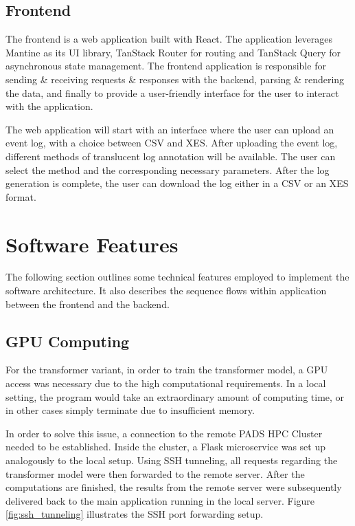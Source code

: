\subsection{Frontend}

The frontend is a web application built with React. The application leverages Mantine as its UI library, TanStack Router for routing and TanStack Query for asynchronous state management. The frontend application is responsible for sending \& receiving requests \& responses with the backend, parsing \& rendering the data, and finally to provide a user-friendly interface for the user to interact with the application.

The web application will start with an interface where the user can upload an event log, with a choice between CSV and XES. After uploading the event log, different methods of translucent log annotation will be available. The user can select the method and the corresponding necessary parameters. After the log generation is complete, the user can download the log either in a CSV or an XES format.

\section{Software Features}

The following section outlines some technical features employed to implement the software architecture. It also describes the sequence flows within application between the frontend and the backend.

\subsection{GPU Computing}
For the transformer variant, in order to train the transformer model, a GPU access was necessary due to the high computational requirements. In a local setting, the program would take an extraordinary amount of computing time, or in other cases simply terminate due to insufficient memory.

In order to solve this issue, a connection to the remote PADS HPC Cluster needed to be established. Inside the cluster, a Flask microservice was set up analogously to the local setup. Using SSH tunneling, all requests regarding the transformer model were then forwarded to the remote server. After the computations are finished, the results from the remote server were subsequently delivered back to the main application running in the local server. Figure \ref{fig:ssh_tunneling} illustrates the SSH port forwarding setup.

